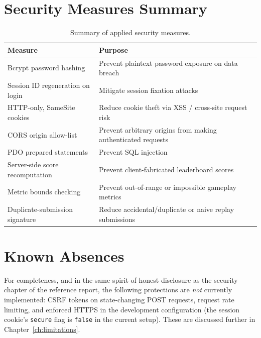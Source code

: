 \section{Security Measures Summary}
\begin{table}[h]
\centering
\caption{Summary of applied security measures.}
\label{tab:security-summary}
\begin{tabular}{@{}p{4.2cm}p{9.5cm}@{}}
\toprule
\textbf{Measure} & \textbf{Purpose} \\
\midrule
Bcrypt password hashing & Prevent plaintext password exposure on data breach \\
Session ID regeneration on login & Mitigate session fixation attacks \\
HTTP-only, SameSite cookies & Reduce cookie theft via XSS / cross-site request risk \\
CORS origin allow-list & Prevent arbitrary origins from making authenticated requests \\
PDO prepared statements & Prevent SQL injection \\
Server-side score recomputation & Prevent client-fabricated leaderboard scores \\
Metric bounds checking & Prevent out-of-range or impossible gameplay metrics \\
Duplicate-submission signature & Reduce accidental/duplicate or naive replay submissions \\
\bottomrule
\end{tabular}
\end{table}

\section{Known Absences}
For completeness, and in the same spirit of honest disclosure as the
security chapter of the reference report, the following protections are
\emph{not} currently implemented: CSRF tokens on state-changing POST
requests, request rate limiting, and enforced HTTPS in the development
configuration (the session cookie's \texttt{secure} flag is \texttt{false}
in the current setup). These are discussed further in
Chapter~\ref{ch:limitations}.
